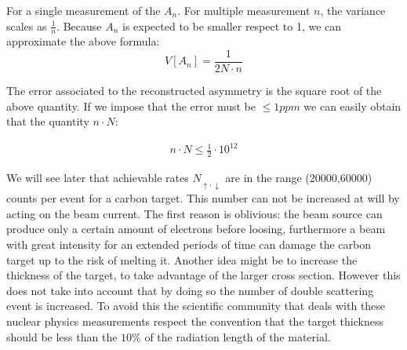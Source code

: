 For a single measurement of the $A_{n}$. For multiple measurement $n$, the variance scales as $\frac{1}{n}$.
Because $A_{n}$ is expected to be smaller respect to 1, we can approximate the above formula:
\begin{equation} 
V[A_{n}] = \dfrac{1}{2N \cdot n}  \label{eq:Error}
\end{equation}

The error associated to the reconstructed asymmetry is the square root of the above quantity. If we impose that the error must be $\le 1ppm$ we can easily obtain that the quantity $n\cdot N$:

\begin{align*}
n\cdot N \le \frac{1}{2} \cdot 10^{12}
\end{align*} 

We will see later that achievable rates $N_{\uparrow,\downarrow}$ are in the range (20000,60000) counts per event for a carbon target. This number can not be increased at will by acting on the beam current. The first reason is oblivious: the beam source can produce only a certain amount of electrons before loosing, furthermore a beam with great intensity for an extended periods of time can damage the carbon target up to the risk of melting it. 
Another idea might be to increase the thickness of the target, to take advantage of the larger cross section. However this does not take into account that by doing so the number of double scattering event is increased. To avoid this the scientific community that deals with these nuclear physics measurements respect the convention that the target thickness should be less than the $10 \%$ of the radiation length of the material.
